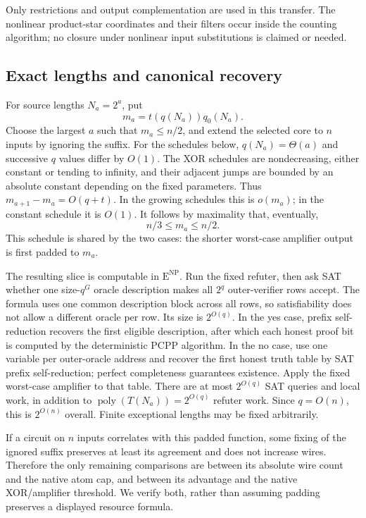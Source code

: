 \documentclass[11pt,letterpaper]{article}
\theoremstyle{definition}
\theoremstyle{remark}
\begin{document}
Only restrictions and output complementation are used in this transfer.
The nonlinear product-star coordinates and their filters occur inside
the counting algorithm; no closure under nonlinear input substitutions
is claimed or needed.

\subsection{Exact lengths and canonical recovery}
\label{tr:lengths}

For source lengths $N_a=2^a$, put
\[
 m_a=t(q(N_a))q_0(N_a).
\]
Choose the largest $a$ such that $m_a\le n/2$, and extend the selected
core to $n$ inputs by ignoring the suffix. For the schedules below,
$q(N_a)=\Theta(a)$ and successive $q$ values differ by $O(1)$.
The XOR schedules are nondecreasing, either constant or tending to
infinity, and their adjacent jumps are bounded by an absolute constant
depending on the fixed parameters. Thus $m_{a+1}-m_a=O(q+t)$.
In the growing schedules this is $o(m_a)$; in the constant schedule
it is $O(1)$. It follows by maximality that, eventually,
\begin{equation}
 n/3\le m_a\le n/2.
 \label{tr:envelope}
\end{equation}
This schedule is shared by the two cases: the shorter worst-case
amplifier output is first padded to $m_a$.

The resulting slice is computable in $\mathrm E^{\mathrm{NP}}$.
Run the fixed refuter, then ask SAT whether one size-$q^G$ oracle
description makes all $2^q$ outer-verifier rows accept. The formula
uses one common description block across all rows, so satisfiability
does not allow a different oracle per row. Its size is $2^{O(q)}$.
In the yes case, prefix self-reduction recovers the first eligible
description, after which each honest proof bit is computed by the
deterministic PCPP algorithm. In the no case, use one variable per
outer-oracle address and recover the first honest truth table by
SAT prefix self-reduction; perfect completeness guarantees existence.
Apply the fixed worst-case amplifier to that table.
There are at most $2^{O(q)}$ SAT queries and local work, in addition
to $\operatorname{poly}(T(N_a))=2^{O(q)}$ refuter work. Since $q=O(n)$,
this is $2^{O(n)}$ overall. Finite exceptional lengths may be fixed
arbitrarily.

If a circuit on $n$ inputs correlates with this padded function, some
fixing of the ignored suffix preserves at least its agreement and
does not increase wires. Therefore the only remaining comparisons are
between its absolute wire count and the native atom cap, and between
its advantage and the native XOR/amplifier threshold. We verify both,
rather than assuming padding preserves a displayed resource formula.
\end{document}
